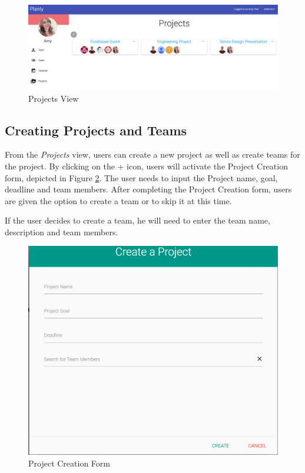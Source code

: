 \begin{figure}[ht]
\centering
\includegraphics[width=\textwidth]{figure43.png}
\caption{Projects View}
\label{projectview}
\end{figure}
\FloatBarrier

\subsection{Creating Projects and Teams}
From the \emph{Projects} view, users can create a new project as well as create teams for the project. By clicking on the + icon, users will activate the Project Creation form, depicted in Figure \ref{projectcreationform}. The user needs to input the Project name, goal, deadline and team members. After completing the Project Creation form, users are given the option to create a team or to skip it at this time. 
\par If the user decides to create a team, he will need to enter the team name, description and team members.

\begin{figure}[ht]
\centering
\includegraphics[width=\textwidth]{figure44.png}
\caption{Project Creation Form}
\label{projectcreationform}
\end{figure}
\FloatBarrier

